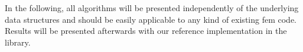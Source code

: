 In the following, all algorithms will be presented independently of the underlying data structures and should be easily applicable to any kind of existing \gls{fem} code. Results will be presented afterwards with our reference implementation in the \dealii{} library.










